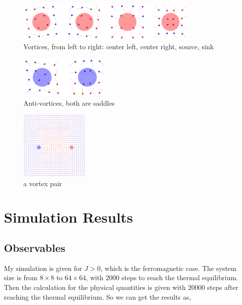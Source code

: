 \documentclass[a4paper]{article}
\begin{document}
\begin{figure}[H]
\centering
\includegraphics[width = 0.8\textwidth]{./vortices1.png}
\caption{Vortices, from left to right: center left, center right, source, sink}
\end{figure}

\begin{figure}[H]
\centering
\includegraphics[width = 0.4\textwidth]{./vortices2.png}
\caption{Anti-vortices, both are saddles}
\end{figure}

\begin{figure}[H]
\centering
\includegraphics[width = 0.3\textwidth]{./vortex_pair.png}
\caption{a vortex pair}
\end{figure}

\section{Simulation Results}

\subsection{Observables}

My simulation is given for $J > 0$, which is the ferromagnetic case. The system size is from $8 \times 8$ to $64 \times 64$, with $2000$ steps to reach the thermal equilibrium. Then the calculation for the physical quantities is given with $20000$ steps after reaching the thermal equilibrium. So we can get the results as,
\end{document}

